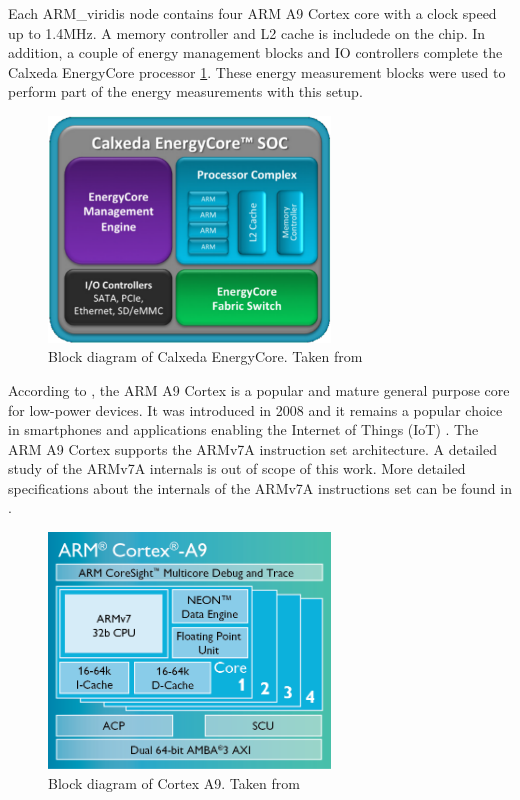 Each ARM\_viridis node contains four ARM A9 Cortex core with a clock speed up
to 1.4MHz. A memory controller and L2 cache is includede on the chip. In
addition, a couple of energy management blocks and IO controllers complete the
Calxeda EnergyCore processor \ref{fig:calxedaSOC}. These energy measurement
blocks were used to perform part of the energy measurements with this setup.


\begin{figure}[h!]
  \centering
    \includegraphics[width=75mm]{"img/calxedaSOC"}
    \caption{Block diagram of Calxeda EnergyCore. Taken from \cite{VIRIDIS}}
    \label{fig:calxedaSOC}
\end{figure}


According to \cite{CORTEXA9}, the ARM A9 Cortex is a popular and mature general
purpose core for low-power devices. It was introduced in 2008 and it remains a
popular choice in smartphones and applications enabling the Internet of Things
(IoT) \cite{CORTEXA9}. The ARM A9 Cortex supports the ARMv7A 
instruction set architecture. A detailed study of the ARMv7A internals is out
of scope of this work. More detailed specifications about the
internals of the ARMv7A instructions set can be found in \cite{CORTEXA9}.


\begin{figure}[h!]
  \centering
    \includegraphics[width=75mm]{"img/cortexA9"}
    \caption{Block diagram of Cortex A9. Taken from \cite{CORTEXA9}}
    \label{fig:cortexA9}
\end{figure}


